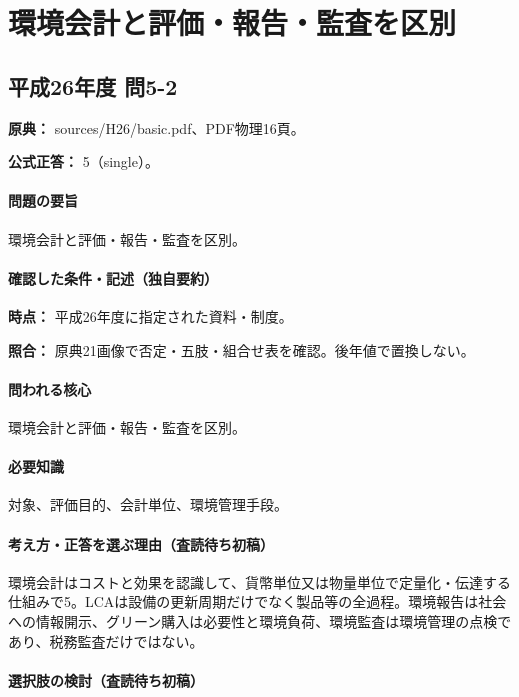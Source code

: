 \section{環境会計と評価・報告・監査を区別}

\subsection{平成26年度 問5-2}
\label{q:h26-reg-basic-5-2}

\noindent\textbf{原典：} sources/H26/basic.pdf、PDF物理16頁。

\textbf{公式正答：} 5（single）。

\paragraph{問題の要旨} 環境会計と評価・報告・監査を区別。

\paragraph{確認した条件・記述（独自要約）}\mbox{}\par

\noindent\textbf{時点：} 平成26年度に指定された資料・制度。\par

\noindent\textbf{照合：} 原典21画像で否定・五肢・組合せ表を確認。後年値で置換しない。\par

\paragraph{問われる核心} 環境会計と評価・報告・監査を区別。

\paragraph{必要知識} 対象、評価目的、会計単位、環境管理手段。

\paragraph{考え方・正答を選ぶ理由（査読待ち初稿）} 環境会計はコストと効果を認識して、貨幣単位又は物量単位で定量化・伝達する仕組みで5。LCAは設備の更新周期だけでなく製品等の全過程。環境報告は社会への情報開示、グリーン購入は必要性と環境負荷、環境監査は環境管理の点検であり、税務監査だけではない。

\paragraph{選択肢の検討（査読待ち初稿）}\mbox{}\par

